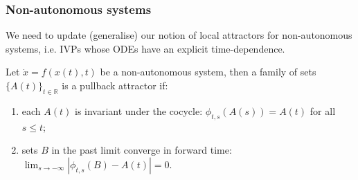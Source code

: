 \documentclass[./main.tex]{subfiles}
\begin{document}
\begin{frame}[t, label=slide12]
        \frametitle{Non-autonomous systems}

        \footnotesize

        We need to update (generalise) our notion of local attractors for non-autonomous systems, i.e. IVPs whose ODEs have an explicit time-dependence.

        \begin{definition}\label{def:pullback_attractor}
                Let $\dot{x} = f(x(t),t)$ be a non-autonomous system, then a family of sets $\{A(t)\}_{t\in \mathbb{R}}$ is a pullback attractor if:
                \begin{enumerate}
                     \item each $A(t)$ is invariant under the cocycle: $\phi_{t,s}(A(s)) = A(t)$ for all $s\leq t$;
                     \item sets $B$ in the past limit converge in forward time: $\lim_{s\to-\infty} |\phi_{t,s}(B)-A(t)| = 0$.
                \end{enumerate}
        \end{definition}

        \vspace{2mm}



 \end{frame}
\end{document}
